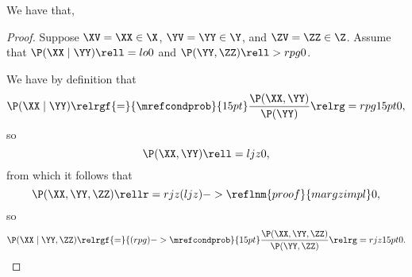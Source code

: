 \begin{proposition}
  We have that, %
\end{proposition}

\begin{proof}
  Suppose 
  $\XV = \XX \in \X$,
  $\YV = \YY \in \Y$, and
  $\ZV = \ZZ \in \Z$. Assume that $\P(\XX \mid \YY) \rell = lo 0$ and $\P(\YY, \ZZ) \rell > rpg 0$.

  We have by definition that
  $$\P(\XX \mid \YY) \relrgf{=}{\mrefcondprob}{15pt} \frac{\P(\XX, \YY)}{\P(\YY)} \relrg = rpg 15pt 0,$$
  so
  $$\P(\XX, \YY) \rell = ljz 0,$$
  from which it follows that
  $$\P(\XX, \YY, \ZZ) \rellr = rjz (ljz)->\reflnm{proof}{margzimpl} 0,$$
  so
  $$\P(\XX \mid \YY, \ZZ) \relrgf{=}{(rpg)->\mrefcondprob}{15pt} \frac{\P(\XX, \YY, \ZZ)}{\P(\YY, \ZZ)}
  \relrg = rjz 15pt 0.$$%
\end{proof}
